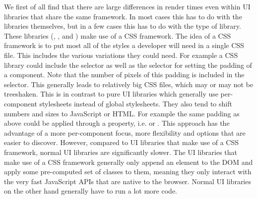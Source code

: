 We first of all find that there are large differences in render times even within UI libraries that share the same framework. In most cases this has to do with the libraries themselves, but in a few cases this has to do with the type of library. These libraries (, , and ) make use of a CSS framework. The idea of a CSS framework is to put most all of the styles a developer will need in a single CSS file. This includes the various variations they could need. For example a CSS library could include the  selector as well as the  selector for setting the padding of a component. Note that the number of pixels of this padding is included in the selector. This generally leads to relatively big CSS files, which may or may not be treeshaken. This is in contrast to pure UI libraries which generally use per-component stylesheets instead of global stylesheets. They also tend to shift numbers and sizes to JavaScript or HTML\@. For example the same padding as above could be applied through a property, i.e.  or . This approach has the advantage of a more per-component focus, more flexibility and options that are easier to discover. However, compared to UI libraries that make use of a CSS framework, normal UI libraries are significantly slower. The UI libraries that make use of a CSS framework generally only append an element to the DOM and apply some pre-computed set of classes to them, meaning they only interact with the very fast JavaScript APIs that are native to the browser. Normal UI libraries on the other hand generally have to run a lot more code.

